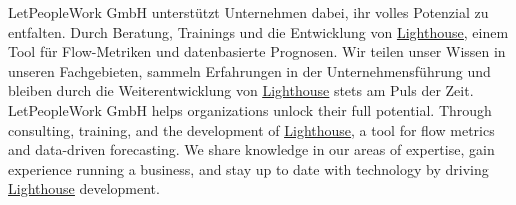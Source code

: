 \vspace{2em}


\begin{cvparagraph}
	{
		LetPeopleWork GmbH unterstützt Unternehmen dabei, ihr volles Potenzial zu entfalten. Durch Beratung, Trainings und die Entwicklung von \underline{\href{https://letpeople.work/lighthouse}{Lighthouse}}, einem Tool für Flow-Metriken und datenbasierte Prognosen.\newline
		Wir teilen unser Wissen in unseren Fachgebieten, sammeln Erfahrungen in der Unternehmensführung und bleiben durch die Weiterentwicklung von \underline{\href{https://letpeople.work/lighthouse}{Lighthouse}} stets am Puls der Zeit.
	}
	{
		LetPeopleWork GmbH helps organizations unlock their full potential. Through consulting, training, and the development of \underline{\href{https://letpeople.work/lighthouse}{Lighthouse}}, a tool for flow metrics and data-driven forecasting.\newline
		We share knowledge in our areas of expertise, gain experience running a business, and stay up to date with technology by driving \underline{\href{https://letpeople.work/lighthouse}{Lighthouse}} development.
	}
\end{cvparagraph}


